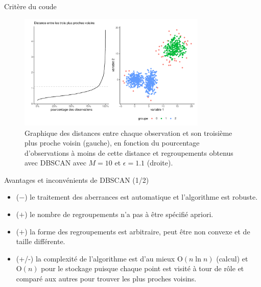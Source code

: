 \documentclass[
  ignorenonframetext,
]{beamer}
\providecommand{\tightlist}{%
  \setlength{\itemsep}{0pt}\setlength{\parskip}{0pt}}\usepackage{longtable,booktabs,array}
\begin{document}
\begin{frame}{Critère du coude}
\protect\hypertarget{crituxe8re-du-coude}{}
\begin{figure}

{\centering \includegraphics[width=0.8\textwidth,height=\textheight]{MATH60602-diapos12_files/figure-beamer/fig-dbscan2-1.pdf}

}

\caption{\label{fig-dbscan2}Graphique des distances entre chaque
observation et son troisième plus proche voisin (gauche), en fonction du
pourcentage d'observations à moins de cette distance et regroupements
obtenus avec DBSCAN avec \(M=10\) et \(\epsilon=1.1\) (droite).}

\end{figure}
\end{frame}

\begin{frame}{Avantages et inconvénients de DBSCAN (1/2)}
\protect\hypertarget{avantages-et-inconvuxe9nients-de-dbscan-12}{}
\begin{itemize}
\tightlist
\item
  (\(-\)) le traitement des aberrances est automatique et l'algorithme
  est robuste.
\item
  (\(+\)) le nombre de regroupements n'a pas à être spécifié apriori.
\item
  (\(+\)) la forme des regroupements est arbitraire, peut être non
  convexe et de taille différente.
\item
  (+/-) la complexité de l'algorithme est d'au mieux
  \(\mathrm{O}(n\ln n)\) (calcul) et \(\mathrm{O}(n)\) pour le stockage
  puisque chaque point est visité à tour de rôle et comparé aux autres
  pour trouver les plus proches voisins.
\end{itemize}
\end{frame}
\end{document}
